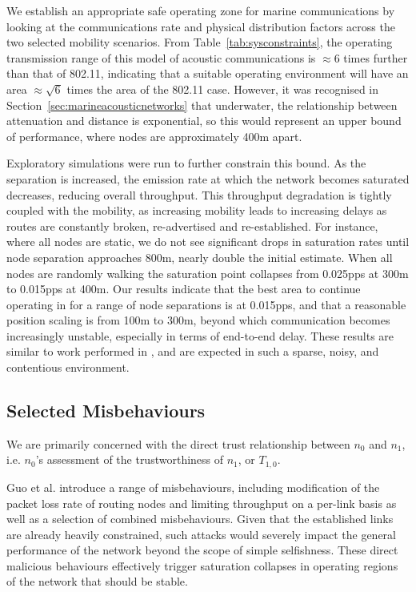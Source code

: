 We establish an appropriate safe operating zone for marine communications by looking at the communications rate and physical distribution factors across the two selected mobility scenarios.
From Table~\ref{tab:sysconstraints}, the operating transmission range of this model of acoustic communications is $\approx 6$ times further than that of 802.11, indicating that a suitable operating environment will have an area $\approx \sqrt{6}$ times the area of the 802.11 case.
However, it was recognised in Section~\ref{sec:marineacousticnetworks} that underwater, the relationship between attenuation and distance is exponential, so this would represent an upper bound of performance, where nodes are approximately 400m apart. 

Exploratory simulations were run to further constrain this bound.
As the separation is increased, the emission rate at which the network becomes saturated decreases, reducing overall throughput. 
This throughput degradation is tightly coupled with the mobility, as increasing mobility leads to increasing delays as routes are constantly broken, re-advertised and re-established. 
For instance, where all nodes are static, we do not see significant drops in saturation rates until node separation approaches 800m, nearly double the initial estimate. 
When all nodes are randomly walking the saturation point collapses from 0.025pps at 300m to 0.015pps at 400m.
Our results indicate that the best area to continue operating in for a range of node separations is at 0.015pps, and that a reasonable position scaling is from 100m to 300m, beyond which communication becomes increasingly unstable, especially in terms of end-to-end delay.
These results are similar to work performed in \cite{Miquel2008}, and are expected in such a sparse, noisy, and contentious environment. 


\subsection{Selected Misbehaviours}


We are primarily concerned with the direct trust relationship between $n_0$ and $n_1$, i.e. $n_0$'s assessment of the trustworthiness of $n_1$, or $T_{1,0}$.

Guo et al. introduce a range of misbehaviours, including modification of the packet loss rate of routing nodes and limiting throughput on a per-link basis as well as a selection of combined misbehaviours. 
Given that the established links are already heavily constrained, such attacks would severely impact the general performance of the network beyond the scope of simple selfishness.
These direct malicious behaviours effectively trigger saturation collapses in operating regions of the network that should be stable.

